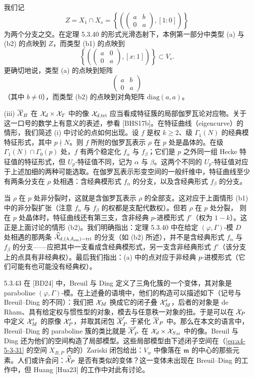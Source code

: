 我们记
\[
Z=X_1\cap X_s=\left\{\left(\begin{pmatrix}a&b\\0&a\end{pmatrix},[1:0]\right)\right\}
\]
为两个分支之交。在定理 5.3.40 的形式光滑态射下，本例第一部分中类型 (a) 与 (b2) 的点映到 $Z$，而类型 (b1) 的点映到
\[
\left\{\left(\begin{pmatrix}a&0\\0&a\end{pmatrix},[x:1]\right)\right\}\subset V_s.
\]
更确切地说，类型 (a) 的点映到矩阵
\[
\begin{pmatrix}a&b\\0&a\end{pmatrix}
\]
（其中 $b\neq0$），而类型 (b2) 的点映到对角矩阵 $\mathrm{diag}(a,a)$。

(iii) $\overline{\mathcal{X}}_B$ 在 $\mathcal{X}_d\times\mathcal{X}_T$ 中的像 $\mathcal{X}_{d,\mathrm{tri}}$ 应当看成特征簇的局部伽罗瓦论对应物。关于这一口号的数学上有意义的表述，参看 [BHS17b]。在特征曲线（eigencurve）的情形，我们简述 (i) 中讨论的点如何出现。设 $f$ 是权 $k\ge2$、级 $\Gamma_1(N)$ 的经典模特征形式，其中 $p\nmid N$。则 $f$ 所附的伽罗瓦表示 $\rho$ 在 $p$ 处是晶体的。在级 $\Gamma_1(N)\cap\Gamma_0(p)$ 处，$f$ 有两个稳定化 $f_\alpha$ 与 $f_\beta$；它们是 $p$ 之外同一组 Hecke 特征值的特征形式，但 $U_p$-特征值不同，记为 $\alpha$ 与 $\beta$。这两个不同的 $U_p$-特征值对应于上述加细的两种可能选取。在伽罗瓦表示形变空间的一般纤维中，特征曲线至少有两条分支在 $\rho$ 处相遇：含经典模形式 $f_\alpha$ 的分支，以及含经典形式 $f_\beta$ 的分支。

当 $\rho$ 在 $p$ 处非分裂时，这就是含伽罗瓦表示 $\rho$ 的全部支。这对应于上面情形 (b1) 中的非分裂扩张（注意 $f_\alpha$ 与 $f_\beta$ 的权都是支配代数权）。但若 $\rho$ 在 $p$ 处分裂，
则在 $p$ 处晶体时，特征曲线还有第三支，含非经典 $p$-进模形式 $f'$（权为 $1-k$）。这正是上面讨论的情形 (b2)。我们明确指出：定理 5.3.40 中在给定 $(\varphi,\Gamma)$-模 $D$ 处相遇的那两条 $\widehat{\mathcal{X}}_{d,(\lambda,\delta_{\mathrm{sm}})-\mathrm{tri}}$ 的分支（如 (b2) 所述），并不是含经典形式 $f_\alpha$ 与 $f_\beta$ 的分支——应把其中一支看成含经典模形式，另一支含非经典形式 $f'$（该分支上的点具有非经典权）。最后我们指出：(a) 中的点对应于非经典 $p$-进模形式（它们可能有也可能没有经典权）。

\begin{rem}{5.3.43}\label{thm:a4-5-3-43}
在 [BD24] 中，Breuil 与 Ding 定义了三角化簇的一个变体，其对象是 paraboline $(\varphi,\Gamma)$-模。在上述叠的语境中，他们的构造可以描述如下（记号与 Breuil--Ding 的不同）：我们把 $\mathcal{X}_M$ 换成它的闭子叠 $\mathcal{X}'_M$，后者的对象是 de Rham、具有给定权与惯性型的对象，模去与任意秩一对象的扭。于是可以在 $\mathcal{X}_P$ 中定义 $\mathcal{X}'_M$ 的原像 $\mathcal{X}'_P$，并取其闭包 $\overline{\mathcal{X}}'_P$ 于紧化 $\overline{\mathcal{X}}_P$ 中。那么在本文的语言中，Breuil--Ding 的 paraboline 簇的类比就是 $\overline{\mathcal{X}}'_P$ 在 $\mathcal{X}_d\times\mathcal{X}_{S_M}$ 中的像。Breuil 与 Ding 还为他们的空间构造了局部模型。这些局部模型由下述闭子空间在（\eqref{eq:a4-5-3-31} 的空间 $X_{B,P}$ 内的）Zariski 闭包给出：$V_w$ 中像落在 $\mathfrak{m}$ 的中心的那些元素。人们或许会问：$\widetilde{\mathcal{X}}_P$ 是否有类似的变体？这一变体未出现在 Breuil--Ding 的工作中，但 Huang [Hua23] 的工作中对此有讨论。
\end{rem}

